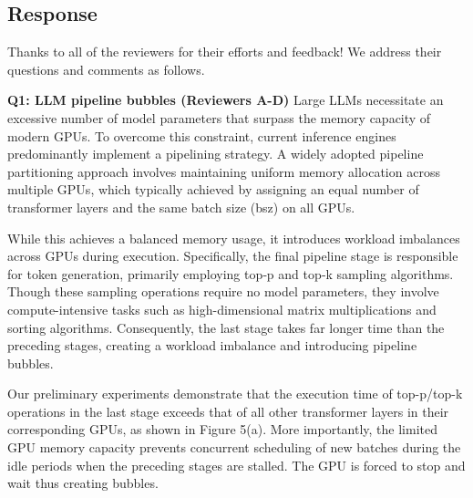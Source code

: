  



\subsection{Response}

Thanks to all of the reviewers for their efforts and feedback! We address their questions and comments as follows.

\textbf{Q1: LLM pipeline bubbles (Reviewers A-D)}
Large LLMs necessitate an excessive number of model parameters that surpass the memory capacity of modern GPUs.
To overcome this constraint, current inference engines predominantly implement a pipelining strategy.
A widely adopted pipeline partitioning approach involves maintaining uniform memory allocation across multiple GPUs, which typically achieved by assigning an equal number of transformer layers and the same batch size (bsz) on all GPUs.

While this achieves a balanced memory usage, it introduces workload imbalances across GPUs during execution.
Specifically, the final pipeline stage is responsible for token generation, primarily employing top‑p and top‑k sampling algorithms.
Though these sampling operations require no model parameters, they involve compute-intensive tasks such as high-dimensional matrix multiplications and sorting algorithms.
Consequently, the last stage takes far longer time than the preceding stages, creating a workload imbalance and introducing pipeline bubbles.

Our preliminary experiments demonstrate that the execution time of top-p/top-k operations in the last stage exceeds that of all other transformer layers in their corresponding GPUs, as shown in Figure 5(a).
More importantly, the limited GPU memory capacity prevents concurrent scheduling of new batches during the idle periods when the preceding stages are stalled.
The GPU is forced to stop and wait thus creating bubbles.

